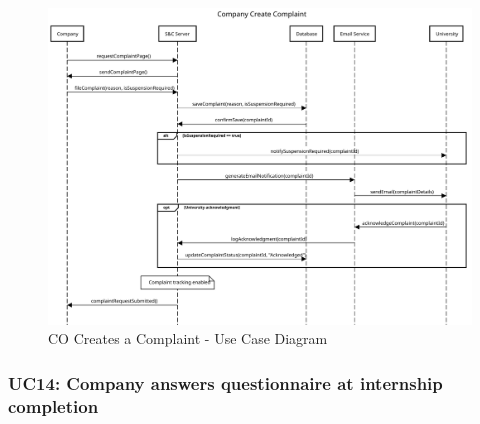 \begin{figure}[H]
    \centering
    \includegraphics[width=1.0\textwidth]{Images/UC_13.pdf}
    \caption{CO Creates a Complaint - Use Case Diagram}
    \label{fig:use-case-diagram-13}
\end{figure}


\subsubsection{UC14: Company answers questionnaire at internship completion}
\label{subsubsec:company-answers-questionnaire-at-internship-completion}


